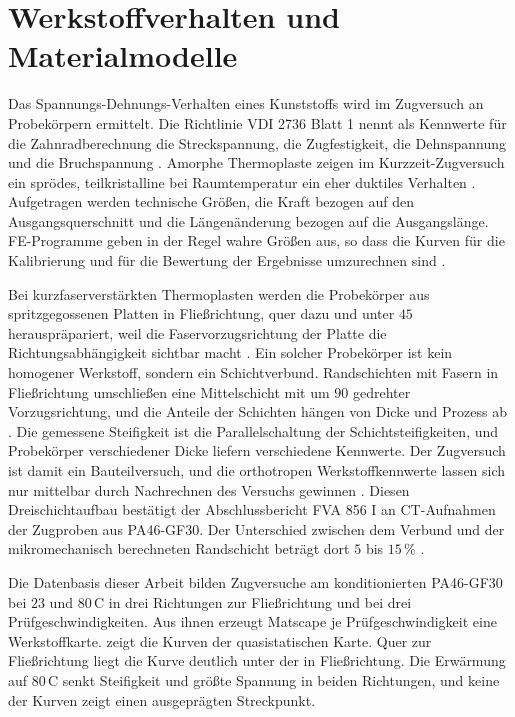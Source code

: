 \section{Werkstoffverhalten und Materialmodelle}
\label{sec:materialmodelle}

Das Spannungs-Dehnungs-Verhalten eines Kunststoffs wird im Zugversuch an Probekörpern ermittelt. Die Richtlinie VDI 2736 Blatt 1 nennt als Kennwerte für die Zahnradberechnung die Streckspannung, die Zugfestigkeit, die Dehnspannung und die Bruchspannung \cite[S.~6]{VDI2736-1}. Amorphe Thermoplaste zeigen im Kurzzeit-Zugversuch ein sprödes, teilkristalline bei Raumtemperatur ein eher duktiles Verhalten \cite[S.~30]{Sto18}. Aufgetragen werden technische Größen, die Kraft bezogen auf den Ausgangsquerschnitt und die Längenänderung bezogen auf die Ausgangslänge. FE-Programme geben in der Regel wahre Größen aus, so dass die Kurven für die Kalibrierung und für die Bewertung der Ergebnisse umzurechnen sind \cite[S.~14 und 16]{Sto18}.

Bei kurzfaserverstärkten Thermoplasten werden die Probekörper aus spritzgegossenen Platten in Fließrichtung, quer dazu und unter $45$\textdegree{} herauspräpariert, weil die Faservorzugsrichtung der Platte die Richtungsabhängigkeit sichtbar macht \cite[S.~106 bis 108]{Sto18}. Ein solcher Probekörper ist kein homogener Werkstoff, sondern ein Schichtverbund. Randschichten mit Fasern in Fließrichtung umschließen eine Mittelschicht mit um $90$\textdegree{} gedrehter Vorzugsrichtung, und die Anteile der Schichten hängen von Dicke und Prozess ab \cite[S.~107]{Sto18}. Die gemessene Steifigkeit ist die Parallelschaltung der Schichtsteifigkeiten, und Probekörper verschiedener Dicke liefern verschiedene Kennwerte. Der Zugversuch ist damit ein Bauteilversuch, und die orthotropen Werkstoffkennwerte lassen sich nur mittelbar durch Nachrechnen des Versuchs gewinnen \cite[S.~107 bis 108]{Sto18}. Diesen Dreischichtaufbau bestätigt der Abschlussbericht FVA 856 I an CT-Aufnahmen der Zugproben aus PA46-GF30. Der Unterschied zwischen dem Verbund und der mikromechanisch berechneten Randschicht beträgt dort $5$ bis $15$\,\% \cite[S.~20 bis 22]{FVA856-I}.

Die Datenbasis dieser Arbeit bilden Zugversuche am konditionierten PA46-GF30 bei $23$ und $80$\,\textdegree C in drei Richtungen zur Fließrichtung und bei drei Prüfgeschwindigkeiten. Aus ihnen erzeugt Matscape je Prüfgeschwindigkeit eine Werkstoffkarte.  zeigt die Kurven der quasistatischen Karte. Quer zur Fließrichtung liegt die Kurve deutlich unter der in Fließrichtung. Die Erwärmung auf $80$\,\textdegree C senkt Steifigkeit und größte Spannung in beiden Richtungen, und keine der Kurven zeigt einen ausgeprägten Streckpunkt.

